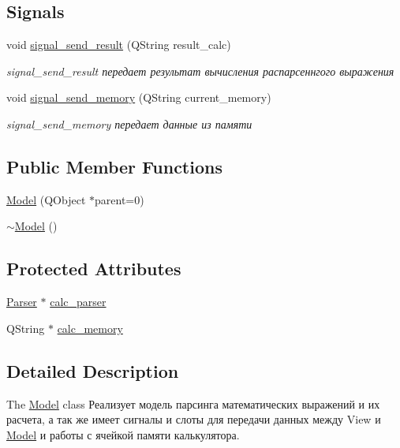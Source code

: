 \subsection*{Signals}
\begin{DoxyCompactItemize}
\item 
void \hyperlink{classModel_a4a77f6f33253def6ffd83efa88869edb}{signal\+\_\+send\+\_\+result} (Q\+String result\+\_\+calc)
\begin{DoxyCompactList}\small\item\em signal\+\_\+send\+\_\+result передает результат вычисления распарсеннгого выражения \end{DoxyCompactList}\item 
void \hyperlink{classModel_a7902313e8c2ad87de9d62f7f6bf29b0c}{signal\+\_\+send\+\_\+memory} (Q\+String current\+\_\+memory)
\begin{DoxyCompactList}\small\item\em signal\+\_\+send\+\_\+memory передает данные из памяти \end{DoxyCompactList}\end{DoxyCompactItemize}
\subsection*{Public Member Functions}
\begin{DoxyCompactItemize}
\item 
\hyperlink{classModel_a7e950e785279235c94c89b16ebea232c}{Model} (Q\+Object $\ast$parent=0)
\item 
\hyperlink{classModel_ad6ebd2062a0b823db841a0b88baac4c0}{$\sim$\+Model} ()
\end{DoxyCompactItemize}
\subsection*{Protected Attributes}
\begin{DoxyCompactItemize}
\item 
\hyperlink{classParser}{Parser} $\ast$ \hyperlink{classModel_a3a8c01642927aabcbdd833a2119c05a6}{calc\+\_\+parser}
\item 
Q\+String $\ast$ \hyperlink{classModel_a37418e7c13627a7c758535273e3b8ac1}{calc\+\_\+memory}
\end{DoxyCompactItemize}


\subsection{Detailed Description}
The \hyperlink{classModel}{Model} class Реализует модель парсинга математических выражений и их расчета, а так же имеет сигналы и слоты для передачи данных между View и \hyperlink{classModel}{Model} и работы с ячейкой памяти калькулятора. 

